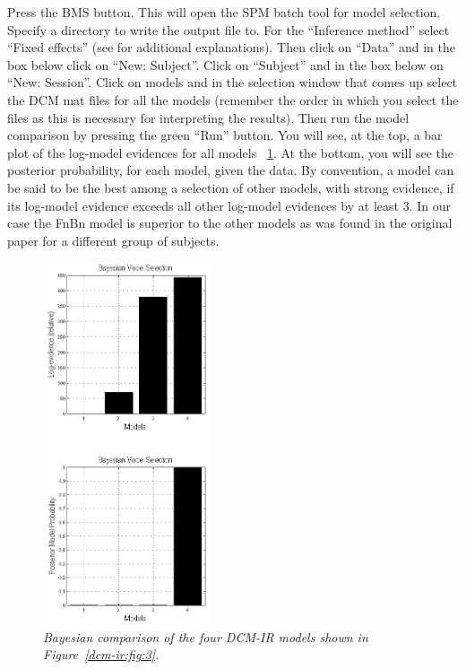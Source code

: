 Press the \textsc{BMS} button. This will open the SPM batch tool for model selection. Specify a directory to write the output file to.  For the ``Inference method'' select ``Fixed effects'' (see \cite{klaas_bms} for additional explanations). Then click on ``Data'' and in the box below click on ``New: Subject''. Click on ``Subject'' and in the box below on ``New: Session''. Click on models and in the selection window that comes up select the DCM mat files for all the models (remember the order in which you select the files as this is necessary for interpreting the results). Then run the model comparison by pressing the green ``Run'' button. You will see, at the top, a bar plot of the log-model evidences for all models ~\ref{dcm-ir:fig:6}. At the bottom, you will see the posterior probability, for each model, given the data. By convention, a model can be said to be the best among a selection of other models, with strong evidence, if its log-model evidence exceeds all other log-model evidences by at least 3. In our case the FnBn model is superior to the other models as was found in the original paper \cite{cc_asymm} for a different group of subjects. 

\begin{figure}
\begin{center}
\includegraphics[width=50mm]{dcm_ir/figures/irfigure6}
\caption{\em Bayesian comparison of the four DCM-IR models shown in Figure~\ref{dcm-ir:fig:3}.\label{dcm-ir:fig:6}}
\end{center}
\end{figure}
